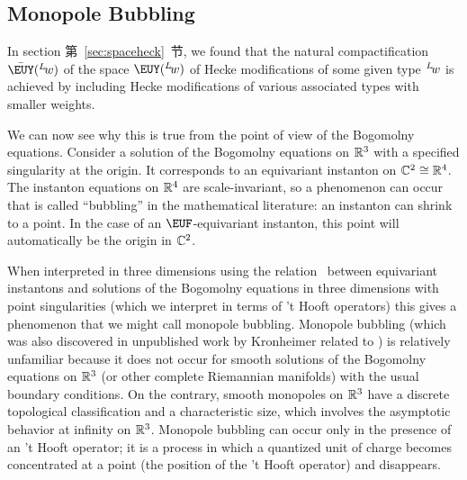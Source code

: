 
\subsection{Monopole Bubbling} \label{sec:monbub}

In section 第~\ref{sec:spaceheck}~节, we found that the natural compactification
$\bar {{\EUY}}(^L\negthinspace w)$ of the space
${{\EUY}}(^L\negthinspace w)$ of Hecke modifications of some given
type $^L\negthinspace w$ is achieved by including Hecke
modifications of various associated types with smaller weights.

We can now see why this is true from the point of view of the
Bogomolny equations.  Consider a solution of the Bogomolny
equations on $\Bbb{R}^3$ with a specified singularity at the
origin.  It corresponds to an equivariant instanton on
$\Bbb{C}^2\cong \Bbb{R}^4$.  The instanton equations on
$\Bbb{R}^4$ are scale-invariant, so a phenomenon can occur that is
called ``bubbling'' in the mathematical literature: an instanton
can shrink to a point.  In the case of an ${\EUF}$-equivariant
instanton, this point will automatically be the origin in
$\Bbb{C}^2$.

When interpreted in three dimensions using the relation
\cite{ref110}\ between equivariant instantons and solutions of
the Bogomolny equations in three dimensions with point
singularities (which we interpret in terms of 't Hooft operators)
this gives a phenomenon that we might call monopole bubbling.
Monopole bubbling (which was also discovered in unpublished work
by Kronheimer related to \cite{ref110}) is relatively unfamiliar
because it does not occur for smooth solutions of the Bogomolny
equations on $\Bbb{R}^3$ (or other complete Riemannian manifolds)
with the usual boundary conditions. On the contrary, smooth
monopoles on $\Bbb{R}^3$ have a discrete topological
classification  and a characteristic size, which involves the
asymptotic behavior at infinity on $\Bbb{R}^3$.  Monopole bubbling
can occur only in the presence of an 't Hooft operator; it is a
process in which a quantized unit of charge becomes concentrated
at a point (the position of the 't Hooft operator) and disappears.

